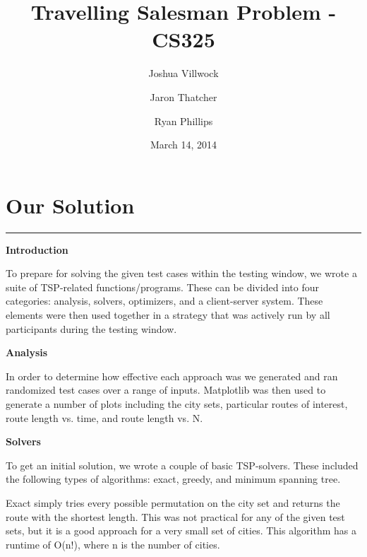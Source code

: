 \documentclass[letterpaper,10pt,titlepage,fleqn]{article}
\begin{document}
\lstset{language=Python} 

\title{Travelling Salesman Problem - CS325}

\author{
	Joshua Villwock \and
	Jaron Thatcher \and
	Ryan Phillips
}

\date{March 14, 2014}
\maketitle



\section*{Our Solution}
\hrule

\begin{Large}
\textbf{Introduction} \\
\end{Large}
To prepare for solving the given test cases within the testing window, we wrote a suite of TSP-related functions/programs. These can be divided into four categories: analysis, solvers, optimizers, and a client-server system. These elements were then used together in a strategy that was actively run by all participants during the testing window. \\

\begin{Large}
\textbf{Analysis} \\
\end{Large}
In order to determine how effective each approach was we generated and ran randomized test cases over a range of inputs. Matplotlib was then used to generate a number of plots including the city sets, particular routes of interest, route length vs. time, and route length vs. N. \\

\begin{Large}
\textbf{Solvers} \\
\end{Large}
To get an initial solution, we wrote a couple of basic TSP-solvers. These included the following types of algorithms: exact, greedy, and minimum spanning tree.

Exact simply tries every possible permutation on the city set and returns the route with the shortest length. This was not practical for any of the given test sets, but it is a good approach for a very small set of cities. This algorithm has a runtime of O(n!), where n is the number of cities.
\end{document}

